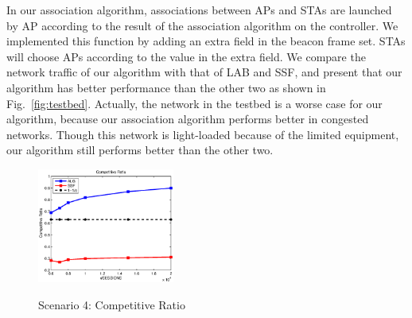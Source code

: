 \documentclass[conference]{IEEEtran}
\def\figwidth{0.4\textwidth}
\begin{document}
  In our association algorithm, associations between APs and STAs are launched by AP according to the result of the association algorithm on the controller.  We implemented this function by adding an extra field in the beacon frame set.  STAs will choose APs according to the value in the extra field.  We compare the network traffic of our algorithm with that of LAB and SSF, and present that our algorithm has better performance than the other two as shown in Fig.~\ref{fig:testbed}.  Actually, the network in the testbed is a worse case for our algorithm, because our association algorithm performs better in congested networks. Though this network is light-loaded because of the limited equipment, our algorithm still performs better than the other two.

 \begin{figure}[!ht]
    \centering
    \includegraphics[width=\figwidth]{Competitive_Ratio.eps}\\
    \caption{Scenario 4: Competitive Ratio }\label{fig:competitive_ratio}
  \end{figure}
\end{document}
